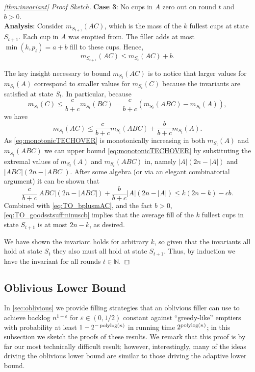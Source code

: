 \begin{proof}[\cref{thm:invariant} Proof Sketch]
\noindent\textbf{Case 3}:
No cups in $A$ zero out on round $t$ and $b > 0$.\\
\textbf{Analysis}:
Consider $m_{S_{t+1}}(AC)$, which is the mass of the $k$ fullest
cups at state $S_{t+1}$. Each cup in $A$ was emptied from. The
filler adds at most $\min(k, p_t) = a+b$ fill to these cups.
Hence, 
\begin{equation}
  \label{eq:TO_bplusmAC}
m_{S_{t+1}}(AC) \le m_{S_t}(AC) + b.
\end{equation}

The key insight necessary to bound $m_{S_{t}}(AC)$ is to
notice that larger values for $m_{S_t}(A)$ correspond to smaller
values for $m_{S_t}(C)$ because the invariants are satisfied at
state $S_t$.
In particular, because
$$m_{S_t}(C) \le \frac{c}{b+c} m_{S_t}(BC) = \frac{c}{b+c}(m_{S_t}(ABC) - m_{S_t}(A)),$$
we have 
\begin{equation}
  \label{eq:monotonicTECHOVER}
  m_{S_{t}}(AC) \le \frac{c}{b+c}m_{S_t}(ABC) + \frac{b}{b+c}m_{S_t}(A).
\end{equation}
As \eqref{eq:monotonicTECHOVER} is monotonically increasing in
both $m_{S_t}(A)$ and $m_{S_t}(ABC)$ we can upper bound
\eqref{eq:monotonicTECHOVER} by substituting the extremal values
of $m_{S_t}(A)$ and $m_{S_t}(ABC)$ in, namely $|A|(2n-|A|)$ and
$|ABC|(2n-|ABC|)$.
After some algebra (or via an elegant combinatorial argument) it can be shown that 
\begin{equation}
  \label{eq:TO_goodsstsuffminuscb}
  \frac{c}{b+c}|ABC|(2n-|ABC|) + \frac{b}{b+c}|A|(2n-|A|) \le k(2n-k)-cb.
\end{equation}
Combined with \eqref{eq:TO_bplusmAC}, and the fact $b>0$,
\eqref{eq:TO_goodsstsuffminuscb} implies that the average fill of
the $k$ fullest cups in state $S_{t+1}$ is at most $2n-k$, as
desired.

We have shown the invariant holds for arbitrary $k$, so given that the
invariants all hold at state $S_t$ they also must all hold at state $S_{t+1}$.
Thus, by induction we have the invariant for all rounds $t\in\mathbb{N}$.
  
\end{proof}
\subsection{Oblivious Lower Bound}

In \cref{sec:oblivious} we provide filling strategies that an
oblivious filler can use to achieve backlog $n^{1-\varepsilon}$
for $\varepsilon \in (0, 1/2)$ constant against
\enquote{greedy-like} emptiers with probability at least
$1-2^{-\operatorname{\text{polylog}}(n)}$ in running time $2^{\operatorname{\text{polylog}}(n)}$; in this
subsection we sketch the proofs of these results. We remark that
this proof is by far our most technically difficult result;
however, interestingly, many of the ideas driving the oblivious
lower bound are similar to those driving the adaptive lower
bound. 

